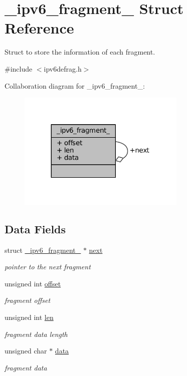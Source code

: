 \hypertarget{struct__ipv6__fragment__}{\section{\-\_\-ipv6\-\_\-fragment\-\_\- Struct Reference}
\label{struct__ipv6__fragment__}
}


Struct to store the information of each fragment.  




{\ttfamily \#include $<$ipv6defrag.\-h$>$}



Collaboration diagram for \-\_\-ipv6\-\_\-fragment\-\_\-\-:
\nopagebreak
\begin{figure}[H]
\begin{center}
\leavevmode
\includegraphics[width=227pt]{struct__ipv6__fragment____coll__graph}
\end{center}
\end{figure}
\subsection*{Data Fields}
\begin{DoxyCompactItemize}
\item 
struct \hyperlink{struct__ipv6__fragment__}{\-\_\-ipv6\-\_\-fragment\-\_\-} $\ast$ \hyperlink{struct__ipv6__fragment___a36d606ad43ccc27ff8dedad831c346b1}{next}
\begin{DoxyCompactList}\small\item\em pointer to the next fragment \end{DoxyCompactList}\item 
unsigned int \hyperlink{struct__ipv6__fragment___a29b5297d3393519050e3126c4cb07c1c}{offset}
\begin{DoxyCompactList}\small\item\em fragment offset \end{DoxyCompactList}\item 
unsigned int \hyperlink{struct__ipv6__fragment___a77124bd5f7e31e6fffc19f335da0c23f}{len}
\begin{DoxyCompactList}\small\item\em fragment data length \end{DoxyCompactList}\item 
unsigned char $\ast$ \hyperlink{struct__ipv6__fragment___ac24cea2bfcc927fd29bc74d1086707d8}{data}
\begin{DoxyCompactList}\small\item\em fragment data \end{DoxyCompactList}\end{DoxyCompactItemize}


